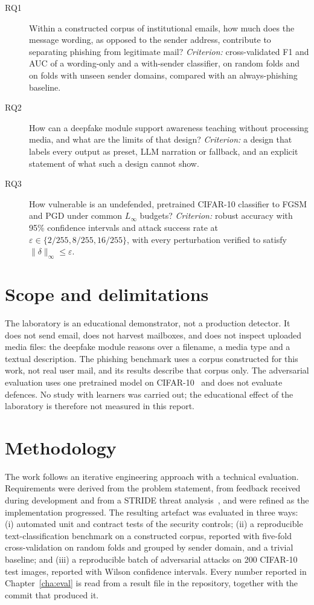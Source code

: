 \begin{description}
\item[RQ1] Within a constructed corpus of institutional emails, how much does the message wording, as opposed to the sender address, contribute to separating phishing from legitimate mail? \emph{Criterion:} cross-validated F1 and AUC of a wording-only and a with-sender classifier, on random folds and on folds with unseen sender domains, compared with an always-phishing baseline.
\item[RQ2] How can a deepfake module support awareness teaching without processing media, and what are the limits of that design? \emph{Criterion:} a design that labels every output as preset, LLM narration or fallback, and an explicit statement of what such a design cannot show.
\item[RQ3] How vulnerable is an undefended, pretrained CIFAR-10 classifier to FGSM and PGD under common $L_\infty$ budgets? \emph{Criterion:} robust accuracy with 95\% confidence intervals and attack success rate at $\varepsilon \in \{2/255, 8/255, 16/255\}$, with every perturbation verified to satisfy $\|\delta\|_\infty \le \varepsilon$.
\end{description}

\section{Scope and delimitations}
\label{sec:scope}

The laboratory is an educational demonstrator, not a production detector. It does not send email, does not harvest mailboxes, and does not inspect uploaded media files: the deepfake module reasons over a filename, a media type and a textual description. The phishing benchmark uses a corpus constructed for this work, not real user mail, and its results describe that corpus only. The adversarial evaluation uses one pretrained model on CIFAR-10~\cite{krizhevsky2009cifar} and does not evaluate defences. No study with learners was carried out; the educational effect of the laboratory is therefore not measured in this report.

\section{Methodology}
\label{sec:method}

The work follows an iterative engineering approach with a technical evaluation. Requirements were derived from the problem statement, from feedback received during development and from a STRIDE threat analysis~\cite{shostack2014threat}, and were refined as the implementation progressed. The resulting artefact was evaluated in three ways: (i) automated unit and contract tests of the security controls; (ii) a reproducible text-classification benchmark on a constructed corpus, reported with five-fold cross-validation on random folds and grouped by sender domain, and a trivial baseline; and (iii) a reproducible batch of adversarial attacks on 200 CIFAR-10 test images, reported with Wilson confidence intervals. Every number reported in Chapter~\ref{cha:eval} is read from a result file in the repository, together with the commit that produced it.


